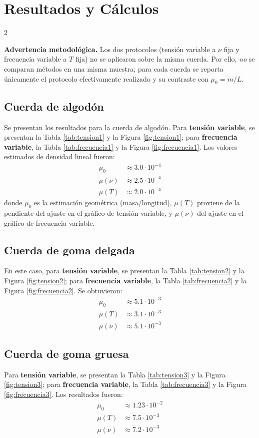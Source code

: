 \section*{Resultados y Cálculos}
\begin{multicols}{2}

\noindent\textbf{Advertencia metodológica.} Los dos protocolos (tensión variable a $\nu$ fija y frecuencia variable a $T$ fija) no se aplicaron sobre la misma cuerda. Por ello, \emph{no} se comparan métodos en una misma muestra; para cada cuerda se reporta únicamente el protocolo efectivamente realizado y su contraste con $\mu_{0}=m/L$.

\subsection*{Cuerda de algodón}
Se presentan los resultados para la cuerda de algodón. Para \textbf{tensión variable}, se presentan la Tabla \ref{tab:tension1} y la Figura \ref{fig:tension1}; para \textbf{frecuencia variable}, la Tabla \ref{tab:frecuencia1} y la Figura \ref{fig:frecuencia1}. Los valores estimados de densidad lineal fueron:
\begin{align*}
\mu_{0} &\approx 3.0\cdot10^{-4} \\
\mu(\nu) &\approx 2.5\cdot10^{-4} \\
\mu(T) &\approx 2.0\cdot10^{-4}
\end{align*}
donde $\mu_{0}$ es la estimación geométrica (masa/longitud), $\mu(T)$ proviene de la pendiente del ajuste en el gráfico de tensión variable, y $\mu(\nu)$ del ajuste en el gráfico de frecuencia variable.

\subsection*{Cuerda de goma delgada}
En este caso, para \textbf{tensión variable}, se presentan la Tabla \ref{tab:tension2} y la Figura \ref{fig:tension2}; para \textbf{frecuencia variable}, la Tabla \ref{tab:frecuencia2} y la Figura \ref{fig:frecuencia2}. Se obtuvieron:
\begin{align*}
\mu_{0} &\approx 5.1\cdot10^{-3} \\
\mu(T) &\approx 3.1\cdot10^{-3} \\
\mu(\nu) &\approx 5.1\cdot10^{-3}
\end{align*}

\subsection*{Cuerda de goma gruesa}
Para \textbf{tensión variable}, se presentan la Tabla \ref{tab:tension3} y la Figura \ref{fig:tension3}; para \textbf{frecuencia variable}, la Tabla \ref{tab:frecuencia3} y la Figura \ref{fig:frecuencia3}. Los resultados fueron:
\begin{align*}
\mu_{0} &\approx 1.23\cdot10^{-2} \\
\mu(T) &\approx 7.5\cdot10^{-3} \\
\mu(\nu) &\approx 7.2\cdot10^{-3}
\end{align*}

\end{multicols}

